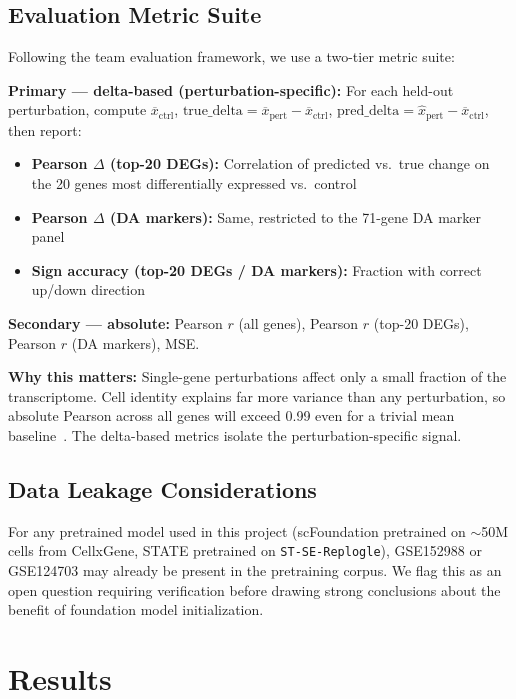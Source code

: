 \documentclass[11pt,letterpaper]{article}
\begin{document}
\subsection{Evaluation Metric Suite}

Following the team evaluation framework, we use a two-tier metric suite:

\textbf{Primary --- delta-based (perturbation-specific):} For each held-out perturbation, compute
$\overline{x}_{\text{ctrl}}$, $\text{true\_delta} = \overline{x}_{\text{pert}} - \overline{x}_{\text{ctrl}}$,
$\text{pred\_delta} = \hat{x}_{\text{pert}} - \overline{x}_{\text{ctrl}}$, then report:
\begin{itemize}[noitemsep]
  \item \textbf{Pearson $\Delta$ (top-20 DEGs):} Correlation of predicted vs.\ true change on
        the 20 genes most differentially expressed vs.\ control
  \item \textbf{Pearson $\Delta$ (DA markers):} Same, restricted to the 71-gene DA marker panel
  \item \textbf{Sign accuracy (top-20 DEGs / DA markers):} Fraction with correct up/down direction
\end{itemize}

\textbf{Secondary --- absolute:} Pearson $r$ (all genes), Pearson $r$ (top-20 DEGs), Pearson $r$
(DA markers), MSE.

\textbf{Why this matters:} Single-gene perturbations affect only a small fraction of the
transcriptome. Cell identity explains far more variance than any perturbation, so absolute Pearson
across all genes will exceed 0.99 even for a trivial mean baseline~\cite{boiarsky2023,wenk2024}.
The delta-based metrics isolate the perturbation-specific signal.

\subsection{Data Leakage Considerations}

For any pretrained model used in this project (scFoundation pretrained on $\sim$50M cells from
CellxGene, STATE pretrained on \texttt{ST-SE-Replogle}), GSE152988 or GSE124703 may already be
present in the pretraining corpus. We flag this as an open question requiring verification before
drawing strong conclusions about the benefit of foundation model initialization.

\section{Results}
\end{document}
